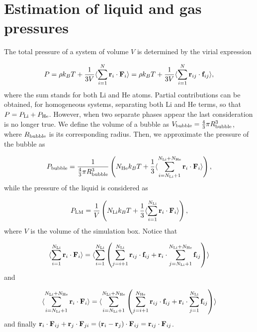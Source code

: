 \documentclass[jcp,amsmath,amssymb,preprint]{revtex4-1}
\begin{document}
\section{Estimation of liquid and gas pressures}

The total pressure of a system of volume $V$ is determined by the virial expression

\begin{equation}
          P = \rho k_B T + \frac{1}{3V} \langle \sum_{i=1}^N {\bf r}_{i} \cdot {\bf F}_{i} \rangle = \rho k_B T + \frac{1}{3V} \langle \sum_{i=1}^N {\bf r}_{ij} \cdot {\bf f}_{ij} \rangle,
                \label{eq_totpres} 
\end{equation}
where the sum stands for both Li and He atoms. Partial contributions can be obtained, for homogeneous systems, separating both Li and He terms, so that $P = P_{\rm Li} + P_{\rm He}$.  However, when two separate phases appear the last consideration is no longer true. We define the volume of a bubble as $V_{\rm bubble} = \frac{4}{3} \pi R_{\rm bubble}^3$, where $R_{\rm bubble}$ is its corresponding radius. Then, we approximate the pressure of the bubble as 

\begin{equation}
          P_{\rm bubble} = \frac{1}{\frac{4}{3} \pi R_{\rm bubble}^3} \left( N_{\rm He} k_B T + \frac{1}{3} \langle \sum_{i=N_{\rm Li}+1}^{N_{\rm Li}+N_{\rm He}} {\bf r}_{i} \cdot {\bf F}_{i} \rangle \right), 
\end{equation}
while the pressure of the liquid is considered as 

\begin{equation}
          P_{\rm LM} = \frac{1}{V} \left( N_{\rm Li} k_B T + \frac{1}{3} \langle \sum_{i=1}^{N_{\rm Li}} {\bf r}_{i} \cdot {\bf F}_{i} \rangle \right), 
\end{equation}
where $V$ is the volume of the simulation box.  Notice that

\begin{equation}
          \langle \sum_{i=1}^{N_{\rm Li}} {\bf r}_{i} \cdot {\bf F}_{i} \rangle = \langle \sum_{i=1}^{N_{\rm Li}} \left(\sum_{j=i+1}^{N_{\rm Li}} {\bf r}_{ij} \cdot {\bf f}_{ij} + {\bf r}_{i} \cdot \sum_{j=N_{\rm Li}+1}^{N_{\rm Li}+N_{\rm He}} {\bf f}_{ij}\right) \rangle 
\end{equation}
and

\begin{equation}
          \langle \sum_{i=N_{\rm Li}+1}^{N_{\rm Li}+N_{\rm He}} {\bf r}_{i} \cdot {\bf F}_{i} \rangle = \langle \sum_{i=N_{\rm Li}+1}^{N_{\rm Li}+N_{\rm He}} \left(\sum_{j=i+1}^{N_{\rm He}} {\bf r}_{ij} \cdot {\bf f}_{ij} + {\bf r}_{i}\cdot\sum_{j=1}^{N_{\rm Li}} {\bf f}_{ij}\right) \rangle
\end{equation}
and finally ${\bf r}_{i}\cdot{\bf F}_{ij}+{\bf r}_{j}\cdot{\bf F}_{ji} = ({\bf r}_{i}-{\bf r}_{j}) \cdot {\bf F}_{ij} = {\bf r}_{ij} \cdot {\bf F}_{ij}$.
\end{document}
